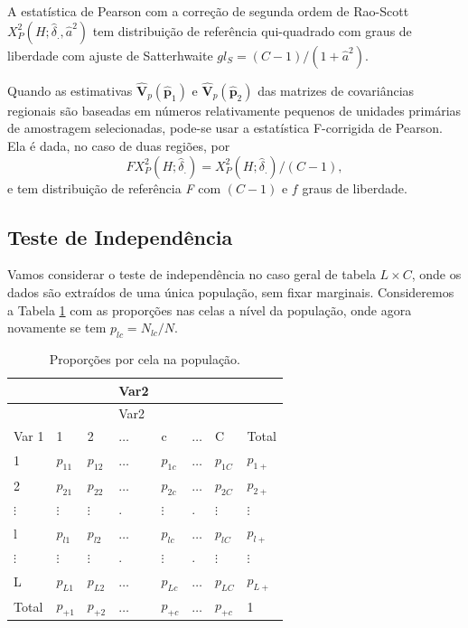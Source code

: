 \documentclass[]{book}
\theoremstyle{definition}
\theoremstyle{definition}
\theoremstyle{definition}
\theoremstyle{remark}
\begin{document}
A estatística de Pearson com a correção de segunda ordem de Rao-Scott
\(X_{P}^{2}\left( H;\hat{\delta}_{.},\hat{a}^{2}\right)\) tem
distribuição de referência qui-quadrado com graus de liberdade com
ajuste de Satterhwaite
\(gl_{S}=\left( C-1\right) /\left( 1+\hat{a} ^{2}\right)\).

Quando as estimativas
\(\mathbf{\hat{V}}_{p}\left( \widehat{\mathbf{p}} _{1}\right)\) e
\(\mathbf{\hat{V}}_{p}\left( \widehat{\mathbf{p}}_{2}\right)\) das
matrizes de covariâncias regionais são baseadas em números relativamente
pequenos de unidades primárias de amostragem selecionadas, pode-se usar
a estatística F-corrigida de Pearson. Ela é dada, no caso de duas
regiões, por \[
FX_{P}^{2}\left( H;\hat{\delta}_{.}\right) =X_{P}^{2}\left( H;\hat{\delta}
_{.}\right) /\left( C-1\right),
\] e tem distribuição de referência \emph{F} com \(\left(C-1\right)\) e
\(f\) graus de liberdade.

\subsection{Teste de Independência}\label{teste-de-independencia-1}

Vamos considerar o teste de independência no caso geral de tabela
\(L\times C\), onde os dados são extraídos de uma única população, sem
fixar marginais. Consideremos a Tabela \ref{tab:tab83} com as proporções
nas celas a nível da população, onde agora novamente se tem
\(p_{lc}=N_{lc}/N\).

\begin{longtable}[]{@{}llllllll@{}}
\caption{\label{tab:tab83} Proporções por cela na população.}\tabularnewline
\toprule
& & & Var2 & & & &\tabularnewline
\midrule
\endfirsthead
\toprule
& & & Var2 & & & &\tabularnewline
\midrule
\endhead
Var 1 & 1 & 2 & \(\ldots\) & c & \(\ldots\) & C & Total\tabularnewline
1 & \(p_{11}\) & \(p_{12}\) & \(\ldots\) & \(p_{1c}\) & \(\ldots\) &
\(p_{1C}\) & \(p_{1+}\)\tabularnewline
2 & \(p_{21}\) & \(p_{22}\) & \(\ldots\) & \(p_{2c}\) & \(\ldots\) &
\(p_{2C}\) & \(p_{2+}\)\tabularnewline
\(\vdots\) & \(\vdots\) & \(\vdots\) & . & \(\vdots\) & . & \(\vdots\) &
\(\vdots\)\tabularnewline
l & \(p_{l1}\) & \(p_{l2}\) & \(\ldots\) & \(p_{lc}\) & \(\ldots\) &
\(p_{lC}\) & \(p_{l+}\)\tabularnewline
\(\vdots\) & \(\vdots\) & \(\vdots\) & . & \(\vdots\) & . & \(\vdots\) &
\(\vdots\)\tabularnewline
L & \(p_{L1}\) & \(p_{L2}\) & \(\ldots\) & \(p_{Lc}\) & \(\ldots\) &
\(p_{LC}\) & \(p_{L+}\)\tabularnewline
Total & \(p_{+1}\) & \(p_{+2}\) & \(\ldots\) & \(p_{+c}\) & \(\ldots\) &
\(p_{+c}\) & 1\tabularnewline
\bottomrule
\end{longtable}
\end{document}
